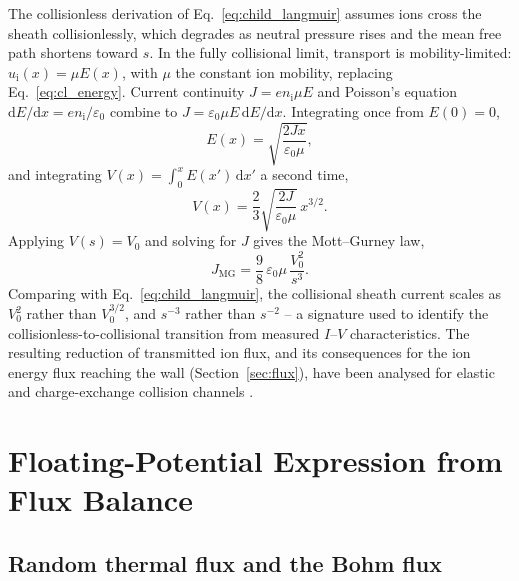 The collisionless derivation of Eq.~\eqref{eq:child_langmuir} assumes ions cross the sheath collisionlessly, which degrades as neutral pressure rises and the mean free path shortens toward $s$. In the fully collisional limit, transport is mobility-limited: $u_{\mathrm{i}}(x) = \mu E(x)$, with $\mu$ the constant ion mobility, replacing Eq.~\eqref{eq:cl_energy}. Current continuity $J = e n_{\mathrm{i}}\mu E$ and Poisson's equation $\mathrm{d}E/\mathrm{d}x = en_{\mathrm{i}}/\varepsilon_{0}$ combine to $J = \varepsilon_{0}\mu E\,\mathrm{d}E/\mathrm{d}x$. Integrating once from $E(0)=0$,
\begin{equation}
E(x) = \sqrt{\frac{2Jx}{\varepsilon_{0}\mu}},
\end{equation}
and integrating $V(x) = \int_{0}^{x} E(x')\,\mathrm{d}x'$ a second time,
\begin{equation}
V(x) = \frac{2}{3}\sqrt{\frac{2J}{\varepsilon_{0}\mu}}\,x^{3/2}.
\end{equation}
Applying $V(s) = V_{0}$ and solving for $J$ gives the Mott--Gurney law,
\begin{equation}
\boxed{J_{\mathrm{MG}} = \frac{9}{8}\,\varepsilon_{0}\mu\,\frac{V_{0}^{2}}{s^{3}}}.
\label{eq:mott_gurney}
\end{equation}
Comparing with Eq.~\eqref{eq:child_langmuir}, the collisional sheath current scales as $V_{0}^{2}$ rather than $V_{0}^{3/2}$, and $s^{-3}$ rather than $s^{-2}$ -- a signature used to identify the collisionless-to-collisional transition from measured $I$--$V$ characteristics. The resulting reduction of transmitted ion flux, and its consequences for the ion energy flux reaching the wall (Section~\ref{sec:flux}), have been analysed for elastic and charge-exchange collision channels \cite{ref0090}.

\section{Floating-Potential Expression from Flux Balance}
\label{sec:floating}

\subsection{Random thermal flux and the Bohm flux}

